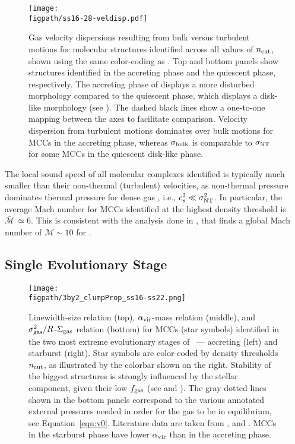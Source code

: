 \IfFileExists{emulateapjlegacy.cls}{\documentclass[iop]{emulateapjlegacy}}{\documentclass[iop]{emulateapj}}
\def\figpath{./Fig}
\begin{document}
\begin{figure}
\centering
\texttt{[image: \\figpath/ss16-28-veldisp.pdf]}
\caption{Gas velocity dispersions resulting from bulk versus turbulent motions for molecular structures
identified across all values of $n_{\rm cut}$, shown using the same color-coding as .
%
Top and bottom panels show structures identified in the accreting phase and the quiescent phase, respectively.
The accreting phase of \flower displays a more disturbed morphology compared to the quiescent phase, which displays a disk-like morphology (see ).
%
The dashed black lines show a one-to-one mapping between the axes to facilitate comparison.
%
Velocity dispersion from turbulent motions dominates over bulk motions for MCCs in the accreting phase, whereas
$\sigma_{\rm bulk}$ is comparable to $\sigma_{\rm NT}$ for some MCCs in the quiescent disk-like phase.
\label{fig:vv}}
\vspace{0.5em}
\end{figure}

The local sound speed of all molecular complexes identified is typically much smaller than their non-thermal (turbulent) velocities,
as non-thermal pressure dominates thermal pressure for dense gas \citep{Pallottini17b}, i.e., $c_s^2 \ll \sigma_{\rm NT}^2$. In particular, the average Mach number for MCCs identified at the highest density threshold is $\bar{\mathcal{M}}\,\simeq6$. This is consistent with the analysis done in \citet{Vallini18a}, that finds a global Mach number of $\mathcal{M} \sim 10$ for \flower.

\subsection{Single Evolutionary Stage}\label{sec:singless}

\begin{figure*}
\centering
\texttt{[image: \\figpath/3by2\_clumpProp\_ss16-ss22.png]}
\caption{
Linewidth-size relation (top), $\alpha_{\rm vir}$-mass relation (middle), and $\sigma_{\rm gas}^2/R$-$\Sigma_{\rm gas}$ relation (bottom) for MCCs (star symbols) identified in the two most extreme evolutionary stages of \flower\ --- accreting (left) and starburst (right).
%
Star symbols are color-coded by density thresholds $n_{\rm cut}$, as illustrated by the colorbar shown on the right.
%
Stability of the biggest structures is strongly influenced by the stellar component, given their low $f_{\rm gas}$ (see  and ).
%
The gray dotted lines shown in the bottom panels correspond to the various annotated external pressures needed in order for the gas to be in equilibrium, see Equation~\ref{eqn:v0}. Literature data are taken from \citet{Larson81a, Heyer04a, Rosolowsky05a, Bolatto08a,
Swinbank11a, Leroy15a, Kauffmann17a}, and \citet{Kauffmann17b}. MCCs in the starburst phase have lower $\alpha_{\rm vir}$ than in the accreting phase.
\label{fig:larsons_single}}
\end{figure*}
\end{document}
